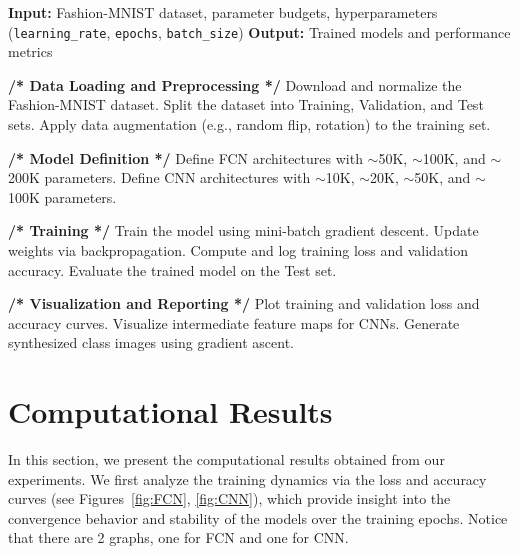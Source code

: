 \documentclass[11pt]{amsart}
\begin{document}
\begin{algorithm}[H]
    \caption{Training and Evaluation of FCN and CNN Models under Weight Budgets}
    \begin{algorithmic}[1]
        \State \textbf{Input:} Fashion-MNIST dataset, parameter budgets, hyperparameters (\texttt{learning\_rate}, \texttt{epochs}, \texttt{batch\_size})
        \State \textbf{Output:} Trained models and performance metrics
        
        \State \textbf{/* Data Loading and Preprocessing */}
        \State Download and normalize the Fashion-MNIST dataset.
        \State Split the dataset into Training, Validation, and Test sets.
        \State Apply data augmentation (e.g., random flip, rotation) to the training set.
        
        \State \textbf{/* Model Definition */}
        \State Define FCN architectures with $\sim$50K, $\sim$100K, and $\sim$200K parameters.
        \State Define CNN architectures with $\sim$10K, $\sim$20K, $\sim$50K, and $\sim$100K parameters.
        
        \State \textbf{/* Training */}
                \State Train the model using mini-batch gradient descent.
                \State Update weights via backpropagation.
                \State Compute and log training loss and validation accuracy.
            \EndFor
            \State Evaluate the trained model on the Test set.
        \EndFor
        
        \State \textbf{/* Visualization and Reporting */}
        \State Plot training and validation loss and accuracy curves.
        \State Visualize intermediate feature maps for CNNs.
        \State Generate synthesized class images using gradient ascent.
    \end{algorithmic}
\end{algorithm}

\section*{Computational Results}\label{sec:results}

In this section, we present the computational results obtained from our experiments. We first analyze the training dynamics via the loss and accuracy curves (see Figures~\ref{fig:FCN}, \ref{fig:CNN}), which provide insight into the convergence behavior and stability of the models over the training epochs. Notice that there are 2 graphs, one for FCN and one for CNN.
\end{document}
